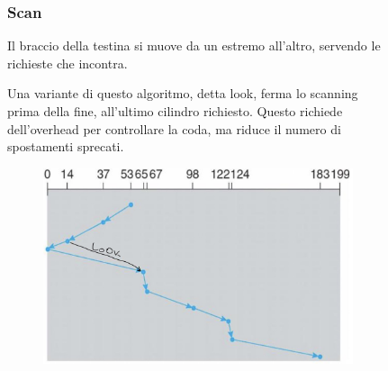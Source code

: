 \begin{figure}[H]
    \centering
    \begin{minipage}{0.5\textwidth}
        \subsubsection*{Scan}
        Il braccio della testina si muove da un estremo all'altro, servendo le richieste che incontra.

        Una variante di questo algoritmo, detta look, ferma lo scanning prima della fine, all'ultimo cilindro richiesto. Questo richiede dell'overhead per controllare la coda, ma riduce il numero di spostamenti sprecati.
    \end{minipage}
    \hfill
    \begin{minipage}{0.4\textwidth}
        \begin{figure}[H]
            \centering
            \includegraphics[width=1\linewidth]{assets/scan.jpg}
        \end{figure}
    \end{minipage}
\end{figure}

